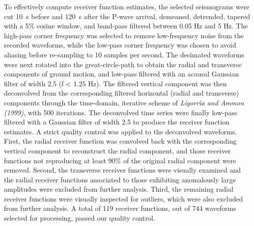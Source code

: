 \documentclass[manuscript,11pt]{geophysics}
\begin{document}
To effectively compute receiver function estimates, the selected seismograms were cut 10~s before and 120~s after the P-wave arrival, demeaned, detrended, tapered with a 5\% cosine window, and band-pass filtered between 0.05 Hz and 5 Hz. The high-pass corner frequency was selected to remove low-frequency noise from the recorded waveforms, while the low-pass corner frequency was chosen to avoid aliasing before re-sampling to 10 samples per second. The decimated waveforms were next rotated into the great-circle-path to obtain the radial and transverse components of ground motion, and low-pass filtered with an acausal Gaussian filter of width 2.5 (f < 1.25 Hz). The filtered vertical component was then deconvolved from the corresponding filtered horizontal (radial and transverse) components through the time-domain, iterative scheme of \textit{Ligorr\'{\i}a and Ammon (1999)}, with 500 iterations. The deconvolved time series were finally low-pass filtered with a Gaussian filter of width 2.5 to produce the receiver function estimates. A strict quality control was applied to the deconvolved waveforms. First, the radial receiver function was convolved back with the corresponding vertical component to reconstruct the radial component, and those receiver functions not reproducing at least 90\% of the original radial component were removed. Second, the transverse receiver functions were visually examined and the radial receiver functions associated to those exhibiting anomalously large amplitudes were excluded from further analysis. Third, the remaining radial receiver functions were visually inspected for outliers, which were also excluded from further analysis. A total of 119 receiver functions, out of 744 waveforms selected for processing, passed our quality control. 
\end{document}
